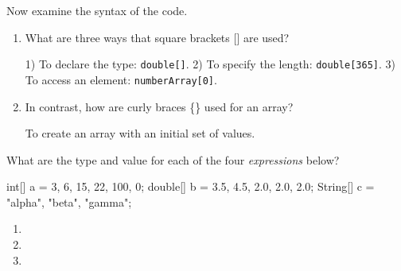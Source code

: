 \Q Now examine the syntax of the code.

\begin{enumerate}
\item What are three ways that square brackets [] are used?

\vspace{-1ex}
\begin{answer}[2em]
1) To declare the type: {\tt double[]}.
2) To specify the length: {\tt double[365]}.
3) To access an element: {\tt numberArray[0]}.
\end{answer}

\item In contrast, how are curly braces \{\} used for an array?

\vspace{-1ex}
\begin{answer}[1em]
To create an array with an initial set of values.
\end{answer}
\end{enumerate}


\newpage

\Q What are the type and value for each of the four \emph{expressions} below?

\begin{javalst}
int[] a = {3, 6, 15, 22, 100, 0};
double[] b = {3.5, 4.5, 2.0, 2.0, 2.0};
String[] c = {"alpha", "beta", "gamma"};
\end{javalst}

\begin{enumerate}
\item {}

\item {}

\item {}

\end{enumerate}

